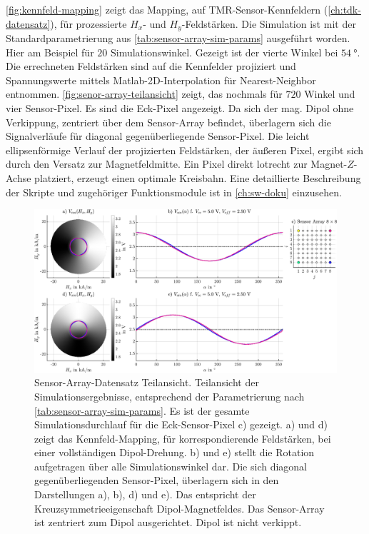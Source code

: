 \autoref{fig:kennfeld-mapping} zeigt das Mapping, auf TMR-Sensor-Kennfeldern (\autoref{ch:tdk-datensatz}), für prozessierte $H_x$- und $H_y$-Feldstärken. Die Simulation ist mit der Standardparametrierung aus \autoref{tab:sensor-array-sim-params} ausgeführt worden. Hier am Beispiel für $20$ Simulationswinkel. Gezeigt ist der vierte Winkel bei $\SI{54}{\degree}$. Die errechneten Feldstärken sind auf die Kennfelder projiziert und Spannungswerte mittels Matlab-2D-Interpolation für Nearest-Neighbor entnommen. \autoref{fig:senor-array-teilansicht} zeigt, das nochmals für $720$ Winkel und vier Sensor-Pixel. Es sind die Eck-Pixel angezeigt. Da sich der mag. Dipol ohne Verkippung, zentriert über dem Sensor-Array befindet, überlagern sich die Signalverläufe für diagonal gegenüberliegende Sensor-Pixel. Die leicht ellipsenförmige Verlauf der projizierten Feldstärken, der äußeren Pixel, ergibt sich durch den Versatz zur Magnetfeldmitte. Ein Pixel direkt lotrecht zur Magnet-$Z$-Achse platziert, erzeugt einen optimale Kreisbahn. Eine detaillierte Beschreibung der Skripte und zugehöriger Funktionsmodule ist in \autoref{ch:sw-doku} einzusehen.


\vspace{5mm}
\begin{figure}[bph]
	\centering
	\includegraphics[width=\linewidth]{appendix/images/5-Sensor-Array-Simulation/Senor-Array-Teilansicht}
	\caption[Sensor-Array-Datensatz Teilansicht]{Sensor-Array-Datensatz Teilansicht. Teilansicht der Simulationsergebnisse, entsprechend der Parametrierung nach \autoref{tab:sensor-array-sim-params}. Es ist der gesamte Simulationsdurchlauf für die Eck-Sensor-Pixel c) gezeigt. a) und d) zeigt das Kennfeld-Mapping, für korrespondierende Feldstärken, bei einer vollständigen Dipol-Drehung. b) und e) stellt die Rotation aufgetragen über alle Simulationswinkel dar. Die sich diagonal gegenüberliegenden Sensor-Pixel, überlagern sich in den Darstellungen a), b), d) und e). Das entspricht der Kreuzsymmetrieeigenschaft Dipol-Magnetfeldes. Das Sensor-Array ist zentriert zum Dipol ausgerichtet. Dipol ist nicht verkippt.}
	\label{fig:senor-array-teilansicht}
\end{figure}
